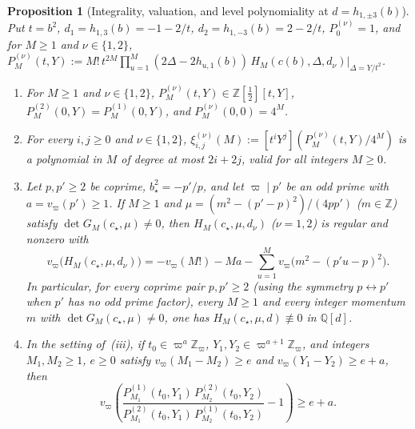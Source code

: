 \documentclass[twoside,10pt]{article}
\numberwithin{equation}{section}
\theoremstyle{slbody}
\newtheorem{proposition}[theorem]{Proposition}
\theoremstyle{definition}
\theoremstyle{remark}
\begin{document}
\begin{proposition}[Integrality, valuation, and level polynomiality at \(d=h_{1,\pm3}(b)\)]
\label{prop:h13-nonvanishing}
Put \(t=b^2\), \(d_1=h_{1,3}(b)=-1-2/t\), \(d_2=h_{1,-3}(b)=2-2/t\),
\(P_0^{(\nu)}=1\), and for \(M\geq1\) and \(\nu\in\{1,2\}\),
\(P_M^{(\nu)}(t,Y):=M!\,t^{2M}\prod_{u=1}^M(2\Delta-2h_{u,1}(b))\,
H_M(c(b),\Delta,d_\nu)|_{\Delta=Y/t^2}\).
\begin{enumerate}\setlength{\itemsep}{1pt}\setlength{\topsep}{3pt}
\item[(i)] For \(M\geq1\) and \(\nu\in\{1,2\}\),
\(P_M^{(\nu)}(t,Y)\in\mathbb Z[\tfrac12][t,Y]\),
\(P_M^{(2)}(0,Y)=P_M^{(1)}(0,Y)\), and \(P_M^{(\nu)}(0,0)=4^M\).
\item[(ii)] For every \(i,j\geq0\) and \(\nu\in\{1,2\}\),
\(\xi_{i,j}^{(\nu)}(M):=[t^iY^j](P_M^{(\nu)}(t,Y)/4^M)\) is a polynomial in
\(M\) of degree at most \(2i+2j\), valid for all integers \(M\geq0\).
\item[(iii)] Let \(p,p'\geq2\) be coprime, \(b_\star^2=-p'/p\), and let
\(\varpi\mid p'\) be an odd prime with \(a=v_\varpi(p')\geq1\).  If
\(M\geq1\) and \(\mu=(m^2-(p'-p)^2)/(4pp')\) (\(m\in\mathbb Z\)) satisfy
\(\det G_M(c_\star,\mu)\neq0\), then \(H_M(c_\star,\mu,d_\nu)\) (\(\nu=1,2\))
is regular and nonzero with
\begin{equation}\label{eq:h13-valuation}
 v_\varpi\bigl(H_M(c_\star,\mu,d_\nu)\bigr)
 =-v_\varpi(M!)-Ma-\sum_{u=1}^M v_\varpi\bigl(m^2-(p'u-p)^2\bigr).
\end{equation}
In particular, for every coprime pair \(p,p'\geq2\) (using the symmetry
\(p\leftrightarrow p'\) when \(p'\) has no odd prime factor), every \(M\geq1\)
and every integer momentum \(m\) with
\(\det G_M(c_\star,\mu)\neq0\), one has \(H_M(c_\star,\mu,d)\not\equiv0\) in
\(\mathbb Q[d]\).
\item[(iv)] In the setting of~(iii), if \(t_0\in\varpi^a\mathbb Z_\varpi\),
\(Y_1,Y_2\in\varpi^{a+1}\mathbb Z_\varpi\), and integers \(M_1,M_2\geq1\),
\(e\geq0\) satisfy \(v_\varpi(M_1-M_2)\geq e\) and \(v_\varpi(Y_1-Y_2)\geq e+a\),
then
\begin{equation}\label{eq:second-screening-lip}
 v_\varpi\!\left(
 \frac{P_{M_1}^{(1)}(t_0,Y_1)\,P_{M_2}^{(2)}(t_0,Y_2)}
      {P_{M_1}^{(2)}(t_0,Y_1)\,P_{M_2}^{(1)}(t_0,Y_2)}-1\right)
 \geq e+a.
\end{equation}
\end{enumerate}
\end{proposition}
\end{document}
